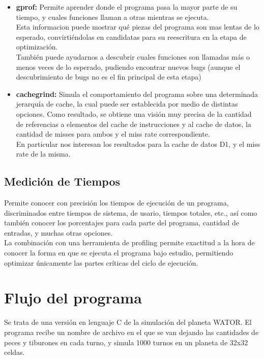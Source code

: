 \documentclass[a4paper,10pt]{article}
\begin{document}
 \begin{itemize}
	
\item {\textbf{gprof:} } {Permite aprender donde el programa pasa la mayor parte de su tiempo, y cuales funciones llaman a otras mientras se ejecuta.\\
 			   Esta informacion puede mostrar qu\'e piezas del programa son mas lentas de lo esperado, convirti\'endolas en candidatas para su reescritura en la etapa de optimizaci\'on.\\
 			   Tambi\'en puede ayudarnos a descubrir cuales funciones son llamadas m\'as o menos veces de lo esperado, pudiendo encontrar nuevos bugs (aunque el descubrimiento de bugs no es el fin principal de esta etapa)
 			   }

\item{\textbf{cachegrind:}}{ Simula el comportamiento del programa sobre una determinada jerarqu\'ia de cache, la cual puede ser establecida por medio de distintas opciones. 
			Como resultado, se obtiene una visi\'on muy precisa de la cantidad de referencias a elementos del cache de instrucciones y al cache de datos, la cantidad de misses para ambos y el miss rate correspondiente.\\
			En particular nos interesan los resultados para la cache de datos D1, y el miss rate de la misma.}
			
\end{itemize}
			   
\subsection{Medici\'on de Tiempos}

Permite conocer con precisi\'on los tiempos de ejecuci\'on de un programa, discriminados entre tiempos de sistema, de usario, tiempos totales, etc., as\'i como tambi\'en conocer los porcentajes para cada parte del programa, cantidad de entradas, y muchas otras opciones.\\
				     La combinaci\'on con una herramienta de profiling permite exactitud a la hora de conocer la forma en que se ejecuta el programa bajo estudio, permitiendo optimizar \'unicamente las partes cr\'iticas del ciclo de ejecuci\'on.

\newpage


\section{Flujo del programa}
Se trata de una versi\'on en lenguaje C de la simulaci\'on del planeta WATOR. El programa recibe un nombre de archivo en el que se van dejando
las cantidades de peces y tiburones en cada turno, y simula 1000 turnos en un planeta de 32x32 celdas.\\
\end{document}
